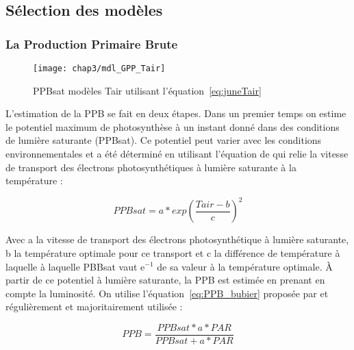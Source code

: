 \subsection{Sélection des modèles}

\subsubsection{La Production Primaire Brute}

\begin{figure}
\centering
\texttt{[image: chap3/mdl\_GPP\_Tair]}
\caption{PPBsat modèles Tair utilisant l'équation~\ref{eq:juneTair}}
\label{fig:mdl_GPP_Tair}
\end{figure}

L'estimation de la PPB se fait en deux étapes.
Dans un premier temps on estime le potentiel maximum de photosynthèse à un instant donné dans des conditions de lumière saturante (PPBsat).
Ce potentiel peut varier avec les conditions environnementales et a été déterminé en utilisant l'équation de \citep{june2004} qui relie la vitesse de transport des électrons photosynthétiques à lumière saturante à la température :

\begin{equation}\label{eq:juneTair}
PPBsat = a * exp(\frac{Tair - b}{c})^2
\end{equation}

Avec a la vitesse de transport des électrons photosynthétique à lumière saturante, b la température optimale pour ce transport et c la différence de température à laquelle à laquelle PBBsat vaut e$^{-1}$ de sa valeur à la température optimale.
À partir de ce potentiel à lumière saturante, la PPB est estimée en prenant en compte la luminosité.
On utilise l'équation~\ref{eq:PPB_bubier} proposée par \citep{bubier1998} et régulièrement et majoritairement utilisée \citep{bortoluzzi2006,worrall2009}:

\begin{equation} \label{eq:PPB_bubier}
PPB = \frac{PPBsat * a * PAR}{PPBsat + a * PAR}
\end{equation}

